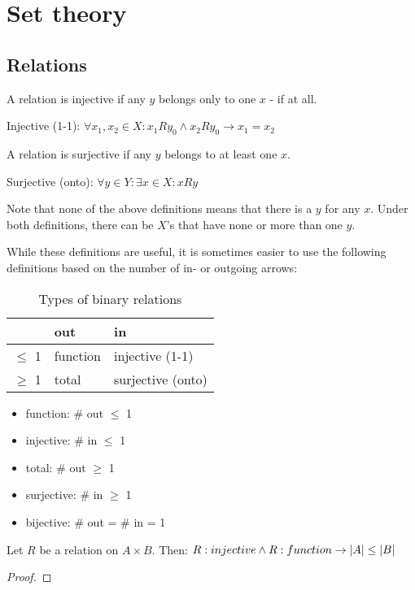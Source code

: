 \section{Set theory}

\subsection{Relations}

A relation is injective if any $y$ belongs only to one $x$ - if at all.
\begin{definition}
    Injective (1-1): $\forall x_1, x_2 \in X: x_1 R y_0 \land x_2 R y_0 \rightarrow x_1 = x_2$
\end{definition}

A relation is surjective if any $y$ belongs to at least one $x$.
\begin{definition}
    Surjective (onto): $\forall y \in Y: \exists x \in X: x R y$
\end{definition}

Note that none of the above definitions means that there is a $y$ for any $x$. Under both definitions, there can be $X$'s that have none or more than one $y$. 

While these definitions are useful, it is sometimes easier to use the following definitions based on the number of in- or outgoing arrows:

\begin{table}[h]
\centering
\caption{Types of binary relations}
\begin{tabular}{@{}lll@{}}
\toprule
               & out      & in         \\ \midrule
$\leq$ 1       & function & injective (1-1) \\
$\geq$ 1       & total    & surjective (onto) \\ \bottomrule
\end{tabular}
\end{table}

\begin{itemize}
    \item function: \# out $\leq$ 1
    \item injective: \# in $\leq$ 1
    \item total: \# out $\geq$ 1
    \item surjective: \# in $\geq$ 1
    \item bijective: \# out = \# in = 1
\end{itemize}

\begin{theorem}
 Let $R$ be a relation on $ A \times B$. Then: 
 $ R:injective \land R:function \to  |A| \leq |B|$
\end{theorem}
\begin{proof}
\end{proof}


